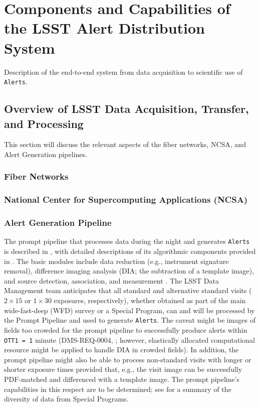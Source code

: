 \section{Components and Capabilities of the LSST Alert Distribution System}\label{sec:components}

Description of the end-to-end system from data acquisition to scientific use of {\tt Alerts}.

\subsection{Overview of LSST Data Acquisition, Transfer, and Processing}

This section will discuss the relevant aspects of the fiber networks, NCSA, and Alert Generation pipelines.

\subsubsection{Fiber Networks}

\subsubsection{National Center for Supercomputing Applications (NCSA)}

\subsubsection{Alert Generation Pipeline}\label{sssec:AGP}

The prompt pipeline that processes data during the night and generates {\tt Alerts} is described in , with detailed descriptions of its algorithmic components provided in . The basic modules include data reduction (e.g., instrument signature removal), difference imaging analysis (DIA; the subtraction of a template image), and source detection, association, and measurement . The LSST Data Management team anticipates that all standard and alternative standard visits ($2\times15$ or $1\times30$ exposures, respectively), whether obtained as part of the main wide-fast-deep (WFD) survey or a Special Program, can and will be processed by the Prompt Pipeline and used to generate {\tt Alerts}. The caveat might be images of fields too crowded for the prompt pipeline to successfully produce alerts within {\tt OTT1 = 1} minute (DMS-REQ-0004, ; however, elastically allocated computational resource might be applied to handle DIA in crowded fields). In addition, the prompt pipeline might also be able to process non-standard visits with longer or shorter exposure times provided that, e.g., the visit image can be successfully PDF-matched and differenced with a template image. The prompt pipeline's capabilities in this respect are to be determined; see  for a summary of the diversity of data from Special Programs.

